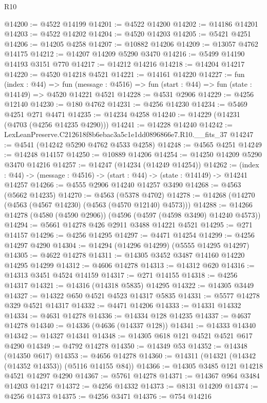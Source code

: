 \begin{lexlean}{R10}
\begin{coremodule}
@14200 := @4522 @14199
@14201 := @4522 @14200
@14202 := @14186 @14201
@14203 := @4522 @14202
@14204 := @4520 @14203
@14205 := @5421 @4251
@14206 := @14205 @4258
@14207 := @10882 @14206
@14209 := @13057 @4762 @14175
@14212 := @14207 @14209 @5290 @3470
@14216 := @5499 @14190 @14193 @3151 @770
@14217 := @14212 @14216
@14218 := @14204 @14217
@14220 := @4520 @14218 @4521
@14221 := @14161 @14220
@14227 := fun (index : @44) =>
  fun (message : @4516) => fun (start : @44) => fun (state : @14149) => @4520 @14221 @4521
@14228 := @4531 @2906
@14229 := @4256 @12140
@14230 := @180 @4762
@14231 := @4256 @14230
@14234 := @5469 @4251 @271 @4471
@14235 := @14234 @4258
@14240 := @14229 (@14231 (@4703 (@4256 @14235 @4290)))
@14241 := @14228 @14240
@14242 := LexLeanPreserve.C212618f8b6ebac3a5c1e1dd0896866e7.R10.__fits_37
@14247 := @4541 (@14242 @5290 @4762 @4533 @4258)
@14248 := @4565 @4251
@14249 := @14248 @14157
@14250 := @10889 @14206
@14254 := @14250 @14209 @5290 @3470 @14216
@14257 := @14247 (@14234 (@14249 @14254))
@14262 := (index : @44) -> (message : @4516) -> (start : @44) -> (state : @14149) -> @14241 @14257
@14266 := @4555 @2906 @14240 @14257 @3490
@14268 := @4563 (@5662 @14235)
@14270 := @4563 (@5378 @4702)
@14278 := @14268 (@14270 (@4563 (@4567 @14230) (@4563 (@4570 @12140) @4573)))
@14288 := @14266 @14278 (@4580 (@4590 @2906)) (@4596 (@4597 (@4598 @3490) @14240 @4573))
@14294 := @5661 @14278 @426 @2911 @3488 @14221 @4521
@14295 := @271 @14157
@14296 := @4256 @14295
@14297 := @4471 @14254
@14299 := @4256 @14297 @4290
@14304 := @14294 (@14296 @14299) (@5555 @14295 @14297)
@14305 := @4622 @14278
@14311 := @14305 @3452 @3487 @14160 @14220 @14295 @14299
@14312 := @4606 @14278
@14313 := @14312 @620
@14316 := @14313 @3451 @4524 @14159
@14317 := @271 @14155
@14318 := @4256 @14317
@14321 := @14316 (@14318 @5835) @14295
@14322 := @14305 @3449
@14327 := @14322 @650 @4521 @4523 @14317 @5835
@14331 := @5577 @14278 @329 @4521 @14317
@14332 := @4471 @14206
@14333 := @14331 @14332
@14334 := @4631 @14278
@14336 := @14334 @128 @14235
@14337 := @4637 @14278
@14340 := @14336 (@4636 (@14337 @128))
@14341 := @14333 @14340
@14342 := @14327 @14341
@14348 := @14305 @618 @121 @4521 @4521 @617 @4290
@14349 := @4792 @14278
@14350 := @14349 @53
@14352 := @14348 (@14350 @617)
@14353 := @4656 @14278
@14360 := @14311 (@14321 (@14342 (@14352 @14353)) (@5116 @14155 @84))
@14366 := @14305 @3485 @121 @14218 @4521 @14297 @4290
@14367 := @5761 @14278
@14371 := @14367 @964 @3484 @14203 @14217
@14372 := @4256 @14332
@14373 := @8131 @14209
@14374 := @4256 @14373
@14375 := @4256 @3471
@14376 := @754 @14216

\end{coremodule}
\end{lexlean}
